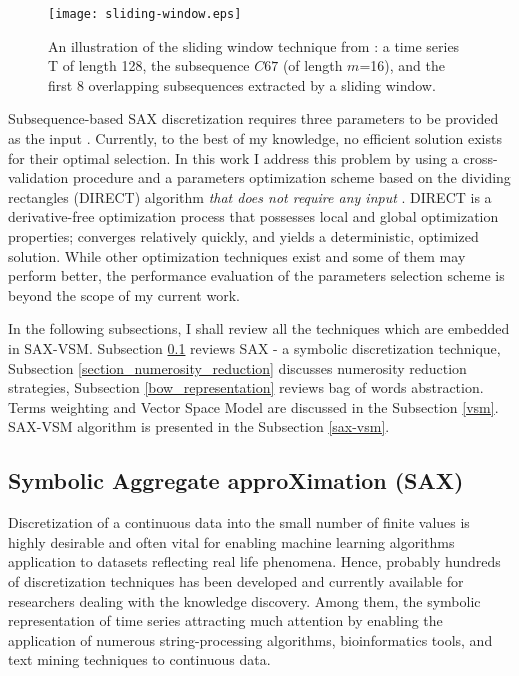 \begin{figure}[t]
   \centering
   \texttt{[image: sliding-window.eps]}
   \caption{An illustration of the sliding window technique from \cite{citeulike:2821475}: a time series T of length 128, 
   the subsequence $C67$ (of length $m$=16), and the first 8 overlapping subsequences extracted by a sliding window.}
   \label{fig:sliding_window}
\end{figure}

Subsequence-based SAX discretization requires three parameters to be provided as the input \cite{citeulike:2821475}. 
Currently, to the best of my knowledge, no efficient solution exists for their optimal selection. 
In this work I address this problem by using a cross-validation procedure and a parameters optimization scheme based on the dividing 
rectangles (DIRECT) algorithm \textit{that does not require any input} \cite{citeulike:12563460}. 
DIRECT is a derivative-free optimization process that possesses local and global optimization properties; converges relatively quickly, 
and yields a deterministic, optimized solution. While other optimization techniques exist and some of them may perform better, 
the performance evaluation of the parameters selection scheme is beyond the scope of my current work.

In the following subsections, I shall review all the techniques which are embedded in SAX-VSM. 
Subsection \ref{section-sax} reviews SAX - a symbolic discretization technique, 
Subsection \ref{section_numerosity_reduction} discusses numerosity reduction strategies,
Subsection \ref{bow_representation} reviews bag of words abstraction.
Terms weighting and Vector Space Model are discussed in the Subsection \ref{vsm}. 
SAX-VSM algorithm is presented in the Subsection \ref{sax-vsm}. 


\subsection{Symbolic Aggregate approXimation (SAX)}\label{section-sax}
Discretization of a continuous data into the small number of finite values is highly desirable and often vital for enabling machine learning 
algorithms application to datasets reflecting real life phenomena. 
Hence, probably hundreds of discretization techniques has been developed and currently available for researchers dealing with 
the knowledge discovery. Among them, the symbolic representation of time series attracting much attention by enabling the application 
of numerous string-processing algorithms, bioinformatics tools, and text mining techniques to continuous data.


